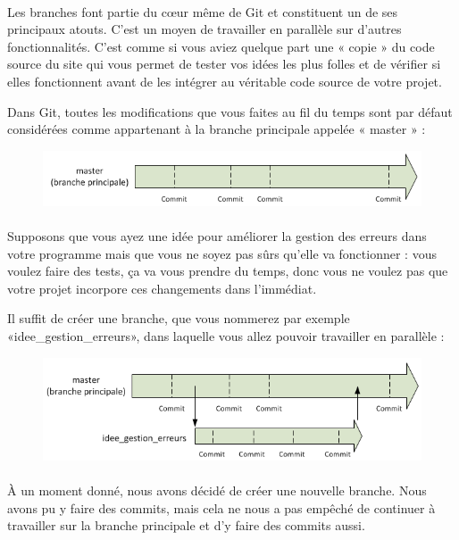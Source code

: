 \documentclass[french, a4paper, 12pt, titlepage]{article}
\begin{document}
\paragraph{}Les branches font partie du cœur même de Git et constituent un de ses principaux atouts. C’est un moyen de travailler en parallèle sur d’autres fonctionnalités. C’est comme si vous aviez quelque part une « copie » du code source du site qui vous permet de tester vos idées les plus folles et de vérifier si elles fonctionnent avant de les intégrer au véritable code source de votre projet.

Dans Git, toutes les modifications que vous faites au fil du temps sont par défaut considérées comme appartenant à la branche principale appelée « master » :

\begin{figure}[h]
\includegraphics[width=\textwidth]{Branch1}
\end{figure}

\paragraph{}Supposons que vous ayez une idée pour améliorer la gestion des erreurs dans votre programme mais que vous ne soyez pas sûrs qu’elle va fonctionner : vous voulez faire des tests, ça va vous prendre du temps, donc vous ne voulez pas que votre projet incorpore ces changements dans l’immédiat.

Il suffit de créer une branche, que vous nommerez par exemple «idee\_gestion\_erreurs», dans laquelle vous allez pouvoir travailler en parallèle :

\begin{figure}[h]
\includegraphics[width=\textwidth]{Branch2}
\end{figure}

\paragraph{}À un moment donné, nous avons décidé de créer une nouvelle branche. Nous avons pu y faire des commits, mais cela ne nous a pas empêché de continuer à travailler sur la branche principale et d’y faire des commits aussi.
\end{document}
